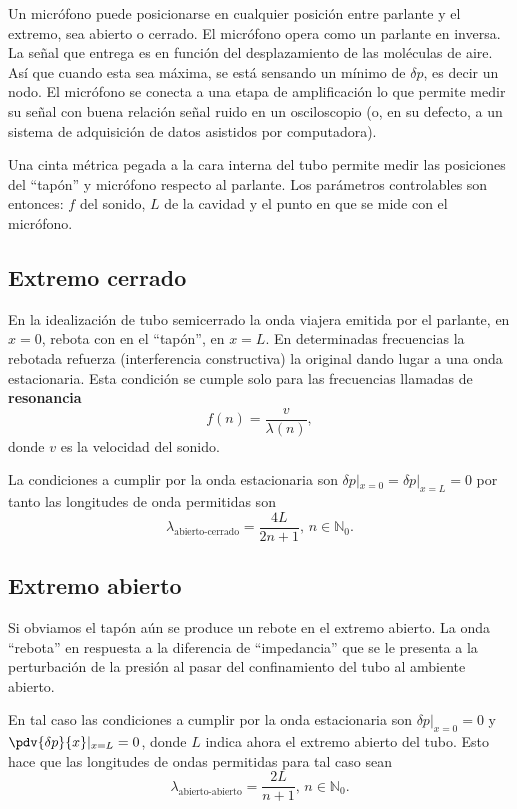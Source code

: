 \documentclass[laboratorio]{guia}
\begin{document}
Un micrófono puede posicionarse en cualquier posición entre parlante y el extremo, sea abierto o cerrado.
El micrófono opera como un parlante en inversa.
La señal que entrega es en función del desplazamiento de las moléculas de aire.
Así que cuando esta sea máxima, se está sensando un mínimo de \(\delta p\), es decir un nodo.
El micrófono se conecta a una etapa de amplificación lo que permite medir su señal con buena relación señal ruido en un osciloscopio (o, en su defecto, a un sistema de adquisición de datos asistidos por computadora). 

Una cinta métrica pegada a la cara interna del tubo permite medir las posiciones del ``tapón'' y micrófono respecto al parlante.
Los parámetros controlables son entonces: \(f\) del sonido, \(L\) de la cavidad y el punto en que se mide con el micrófono.


\subsection{Extremo cerrado}
En la idealización de tubo semicerrado la onda viajera emitida por el parlante, en \(x=0\), rebota con en el ``tapón'', en \(x=L\).
En determinadas frecuencias la rebotada refuerza (interferencia constructiva) la original dando lugar a una onda estacionaria.
Esta condición se cumple solo para las frecuencias llamadas de \textbf{resonancia}
\begin{equation}
  f(n)= \frac{v}{\lambda (n)},  
  \label{eq:frecuencialambda}
\end{equation}
donde \(v\) es la velocidad del sonido.

La condiciones a cumplir por la onda estacionaria son \(\delta p|_{x=0}= \delta p|_{x=L}=0\) por tanto las longitudes de onda permitidas son 
\begin{equation}
  \lambda_\text{abierto-cerrado}= \frac{4 L}{2 n+1}, \, n \in \mathbb{N}_0.
\end{equation}


\subsection{Extremo abierto}
Si obviamos el tapón aún se produce un rebote en el extremo abierto.
La onda ``rebota'' en respuesta a la diferencia de ``impedancia'' que se le presenta a la perturbación de la presión al pasar del confinamiento del tubo al ambiente abierto.

En tal caso las condiciones a cumplir por la onda estacionaria son \(\delta p|_{x=0}=0\) y \(\pdv{\delta p}{x}|_{x=L}=0\), donde \(L\) indica ahora el extremo abierto del tubo.
Esto hace que las longitudes de ondas permitidas para tal caso sean
\begin{equation}
  \lambda_\text{abierto-abierto}= \frac{2 L}{n+1}, \, n \in \mathbb{N}_0.
\end{equation}
\end{document}
